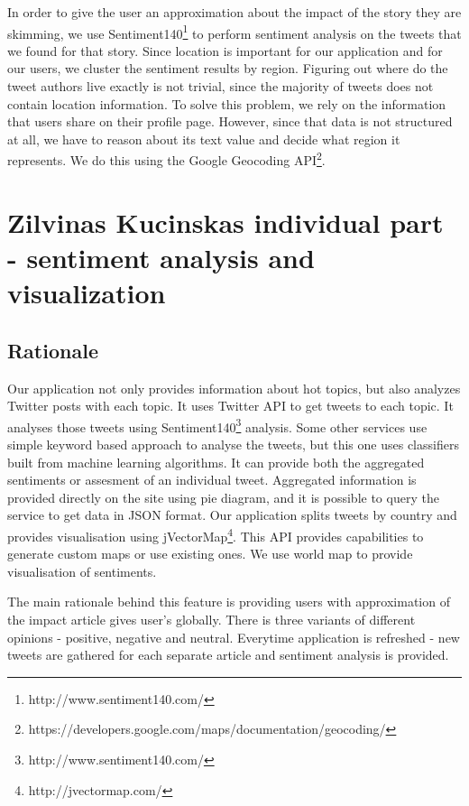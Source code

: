 \documentclass{acm_proc_10ptArticle-sp}
\begin{document}
In order to give the user an approximation about the impact of the story they are skimming, we use Sentiment140\footnote{http://www.sentiment140.com/} to perform sentiment analysis on the tweets that we found for that story. Since location is important for our application and for our users, we cluster the sentiment results by region. Figuring out where do the tweet authors live exactly is not trivial, since the majority of tweets does not contain location information. To solve this problem, we rely on the information that users share on their profile page. However, since that data is not structured at all, we have to reason about its text value and decide what region it represents. We do this using the Google Geocoding API\footnote{https://developers.google.com/maps/documentation/geocoding/}. 

\section{Zilvinas Kucinskas individual part - sentiment analysis and visualization}

\subsection{Rationale}

Our application not only provides information about hot topics, but also analyzes Twitter posts with each topic. It uses Twitter API to get tweets to each topic. It analyses those tweets using Sentiment140\footnote{http://www.sentiment140.com/} analysis. Some other services use simple keyword based approach to analyse the tweets, but this one uses classifiers built from machine learning algorithms. It can provide both the aggregated sentiments or assesment of an individual tweet. Aggregated information is provided directly on the site using pie diagram, and it is possible to query the service to get data in JSON format. Our application splits tweets by country and provides visualisation using jVectorMap\footnote{http://jvectormap.com/}. This API provides capabilities to generate custom maps or use existing ones. We use world map to provide visualisation of sentiments.

The main rationale behind this feature is providing users with approximation of the impact article gives user's globally. There is three variants of different opinions - positive, negative and neutral. Everytime application is refreshed - new tweets are gathered for each separate article and sentiment analysis is provided. 
\end{document}

